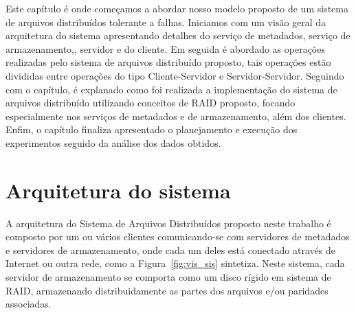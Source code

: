 Este capítulo é onde começamos a abordar nosso modelo proposto de um sistema de arquivos distribuídos tolerante a falhas. Iniciamos com um visão geral da arquitetura do sistema apresentando detalhes do serviço de metadados, serviço de armazenamento,, servidor e do cliente. Em seguida é abordado as operações realizadas pelo sistema de arquivos distribuído proposto, tais operações estão divididas entre operações do tipo Cliente-Servidor e Servidor-Servidor. Seguindo com o capítulo, é explanado como foi realizada a implementação do sistema de arquivos distribuído utilizando conceitos de RAID proposto, focando especialmente nos serviços de metadados e de armazenamento, além dos clientes. Enfim, o capítulo finaliza apresentado o planejamento e execução dos experimentos seguido da análise dos dados obtidos.


	\section{Arquitetura do sistema}
	
	A arquitetura do Sistema de Arquivos Distribuídos proposto neste trabalho é composto por um ou vários clientes comunicando-se com servidores de metadados e servidores de armazenamento, onde cada um deles está conectado através de Internet ou outra rede, como a Figura~\ref{fig:vis_sis}  sintetiza. Neste sistema, cada servidor de armazenamento se comporta como um disco rígido em sistema de RAID, armazenando distribuidamente as partes dos arquivos e/ou paridades associadas. \\
	
	

	
	
